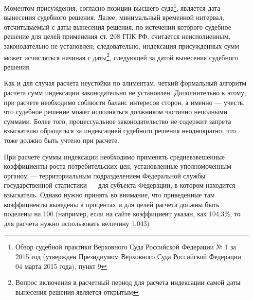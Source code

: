 \documentclass[a4paper,12pt,draft]{article}
\begin{document}
Моментом присуждения, согласно позиции высшего суда\footnote{Обзор судебной практики Верховного Суда Российской Федерации № 1 за 2015 год (утвержден Президиумом Верховного Суда Российской Федерации 04 марта 2015 года), пункт 9}, является дата вынесения судебного решения. Далее, минимальный временной интервал, отсчитываемый с даты вынесения решения, по истечении которого судебное решение для целей применения ст. 208 ГПК РФ, считается неисполненным, законодательно не установлен; следовательно, индексация присужденных сумм может исчисляться начиная с даты\footnote{Вопрос включения в расчетный период для расчета индексации самой даты вынесения решения является открытым}, следующей за датой вынесения судебного решения.

Как и для случая расчета неустойки по алиментам, четкий формальный алгоритм расчета сумм индексации законодательно не установлен. Дополнительно к этому, при расчете необходимо соблюсти баланс интересов сторон, а именно --- учесть, что судебное решение может исполняться должником частично неполными суммами. Более того, процессуальное законодательство не содержит запрета взыскателю обращаться за индексацией судебного решения неоднократно, что тоже должно быть учтено при расчете.

При расчете суммы индексации необходимо применять средневзвешенные коэффициенты роста потребительских цен, установленные уполномоченным органом --- территориальным подразделением Федеральной службы государственной статистики --- для субъекта Федерации, в котором находится взыскатель. Однако нужно принять во внимание, что приведенные там коэффициенты выведены в процентах и для целей расчета должны быть поделены на 100 (например, если на сайте коэффициент указан, как 104,3\%, то для расчета нужно использовать величину 1,043)
\end{document}
